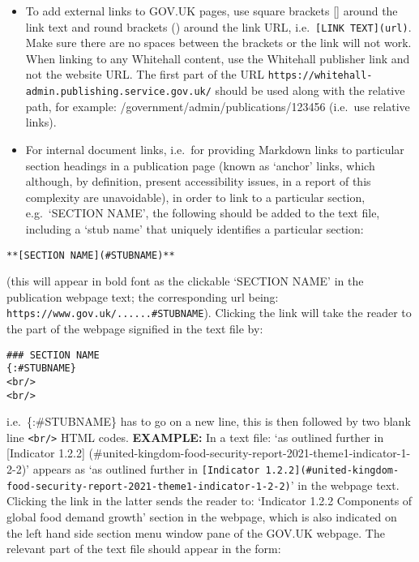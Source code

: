 \documentclass[
]{book}
\begin{document}
\begin{itemize}
\item
  To add external links to GOV.UK pages, use square brackets {[}{]} around the link text and round brackets () around the link URL, i.e.~\texttt{{[}LINK\ TEXT{]}(url)}. Make sure there are no spaces between the brackets or the link will not work. When linking to any Whitehall content, use the Whitehall publisher link and not the website URL. The first part of the URL \texttt{https://whitehall-admin.publishing.service.gov.uk/} should be used along with the relative path, for example: /government/admin/publications/123456 (i.e.~use relative links).
\item
  For internal document links, i.e.~for providing Markdown links to particular section headings in a publication page (known as `anchor' links, which although, by definition, present accessibility issues, in a report of this complexity are unavoidable), in order to link to a particular section, e.g.~`SECTION NAME', the following should be added to the text file, including a `stub name' that uniquely identifies a particular section:
\end{itemize}

\begin{verbatim}
**[SECTION NAME](#STUBNAME)** 
\end{verbatim}

(this will appear in bold font as the clickable `SECTION NAME' in the publication webpage text; the corresponding url being: \texttt{https://www.gov.uk/......\#STUBNAME}). Clicking the link will take the reader to the part of the webpage signified in the text file by:

\begin{verbatim}
### SECTION NAME
{:#STUBNAME}
<br/>
<br/>
\end{verbatim}

i.e.~\{:\#STUBNAME\} has to go on a new line, this is then followed by two blank line \texttt{\textless{}br/\textgreater{}} HTML codes.
\textbf{EXAMPLE:}
In a text file: `as outlined further in {[}Indicator 1.2.2{]} (\#united-kingdom-food-security-report-2021-theme1-indicator-1-2-2)' appears as `as outlined further in \texttt{{[}Indicator\ 1.2.2{]}(\#united-kingdom-food-security-report-2021-theme1-indicator-1-2-2)}' in the webpage text. Clicking the link in the latter sends the reader to: `Indicator 1.2.2 Components of global food demand growth' section in the webpage, which is also indicated on the left hand side section menu window pane of the GOV.UK webpage. The relevant part of the text file should appear in the form:
\end{document}
